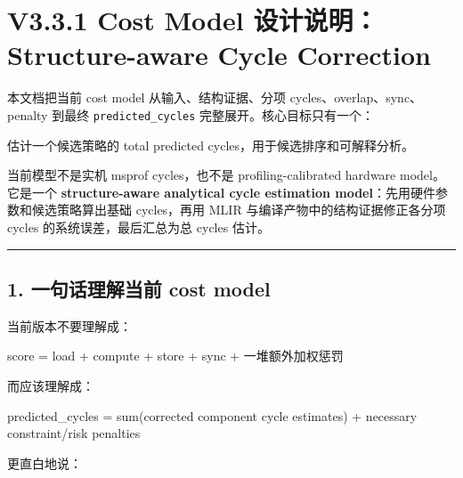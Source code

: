 \documentclass[
  10pt,
]{article}
\author{}
\date{}
\newenvironment{Shaded}{}{}
\newcommand{\NormalTok}[1]{#1}
\begin{document}
{
\setcounter{tocdepth}{3}
\tableofcontents
}
\section{V3.3.1 Cost Model 设计说明：Structure-aware Cycle
Correction}\label{v3.3.1-cost-model-ux8bbeux8ba1ux8bf4ux660estructure-aware-cycle-correction}

本文档把当前 cost model 从输入、结构证据、分项
cycles、overlap、sync、penalty 到最终 \texttt{predicted\_cycles}
完整展开。核心目标只有一个：

\begin{Shaded}
\begin{Highlighting}[]
\NormalTok{估计一个候选策略的 total predicted cycles，用于候选排序和可解释分析。}
\end{Highlighting}
\end{Shaded}

当前模型不是实机 msprof cycles，也不是 profiling-calibrated hardware
model。它是一个 \textbf{structure-aware analytical cycle estimation
model}：先用硬件参数和候选策略算出基础 cycles，再用 MLIR
与编译产物中的结构证据修正各分项 cycles 的系统误差，最后汇总为总 cycles
估计。

\begin{center}\rule{0.5\linewidth}{0.5pt}\end{center}

\subsection{1. 一句话理解当前 cost
model}\label{ux4e00ux53e5ux8bddux7406ux89e3ux5f53ux524d-cost-model}

当前版本不要理解成：

\begin{Shaded}
\begin{Highlighting}[]
\NormalTok{score = load + compute + store + sync + 一堆额外加权惩罚}
\end{Highlighting}
\end{Shaded}

而应该理解成：

\begin{Shaded}
\begin{Highlighting}[]
\NormalTok{predicted\_cycles = sum(corrected component cycle estimates) + necessary constraint/risk penalties}
\end{Highlighting}
\end{Shaded}

更直白地说：
\end{document}
